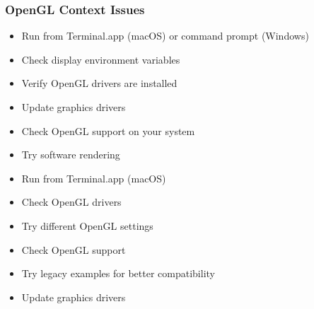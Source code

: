 \documentclass[a4paper,10pt,english,openany,oneside]{sphinxmanual}
\begin{document}
\subsubsection{OpenGL Context Issues}
\label{\detokenize{troubleshooting:opengl-context-issues}}\begin{description}
\begin{itemize}
\item {} 
\sphinxAtStartPar
Run from Terminal.app (macOS) or command prompt (Windows)

\item {} 
\sphinxAtStartPar
Check display environment variables

\item {} 
\sphinxAtStartPar
Verify OpenGL drivers are installed

\end{itemize}

\begin{itemize}
\item {} 
\sphinxAtStartPar
Update graphics drivers

\item {} 
\sphinxAtStartPar
Check OpenGL support on your system

\item {} 
\sphinxAtStartPar
Try software rendering

\end{itemize}

\begin{itemize}
\item {} 
\sphinxAtStartPar
Run from Terminal.app (macOS)

\item {} 
\sphinxAtStartPar
Check OpenGL drivers

\item {} 
\sphinxAtStartPar
Try different OpenGL settings

\end{itemize}

\begin{itemize}
\item {} 
\sphinxAtStartPar
Check OpenGL support

\item {} 
\sphinxAtStartPar
Try legacy examples for better compatibility

\item {} 
\sphinxAtStartPar
Update graphics drivers

\end{itemize}

\end{description}
\end{document}
